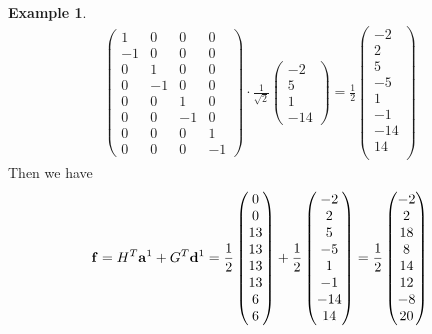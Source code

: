 \documentclass{article}
\theoremstyle{definition}
\newtheorem{example}[definition]{Example}
\begin{document}
\begin{example}
\begin{align*}
\begin{pmatrix}
        1 & 0 & 0 & 0\\
        -1 & 0 & 0 & 0\\
        0 & 1 & 0 & 0\\
        0 & -1 & 0 & 0\\
        0 & 0 & 1 & 0\\
        0 & 0 & -1 & 0\\
        0 & 0 & 0 & 1\\
        0 & 0 & 0 & -1
      \end{pmatrix} \cdot \frac{1}{\sqrt{2}}
      \begin{pmatrix}
        -2 \\
        5 \\
        1 \\
        -14
      \end{pmatrix} = \frac{1}{2}
      \begin{pmatrix}
        -2 \\
        2 \\
        5 \\
        -5 \\
        1 \\
        -1 \\
        -14 \\
        14 \\
      \end{pmatrix}
    \end{align*}
    Then we have
    \[\vb{f} = H^T \vb{a}^1 + G^T \vb{d}^1 = \frac{1}{2}
    \begin{pmatrix}
      0 \\ 0 \\ 13 \\ 13 \\ 13 \\ 13 \\ 6 \\ 6
    \end{pmatrix} + \frac{1}{2}
    \begin{pmatrix}
      -2 \\ 2 \\ 5 \\ -5 \\ 1 \\ -1 \\ -14 \\ 14
    \end{pmatrix} = \frac{1}{2}
    \begin{pmatrix}
      -2 \\ 2 \\ 18 \\ 8 \\ 14 \\ 12 \\ -8 \\ 20

\end{pmatrix}\]
\end{example}
\end{document}

